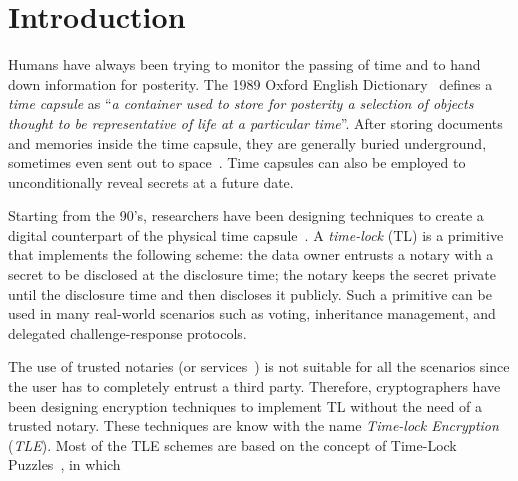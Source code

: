\section{Introduction}\label{sect:introduction}

Humans have always been trying to monitor the passing of time and to hand down information for posterity.
The 1989 Oxford English Dictionary~\cite{dictionary1989oxford} defines a {\em time capsule} as ``{\em a container used to store for posterity a selection of objects thought to be representative of life at a particular time}''.
After storing documents and memories inside the time capsule, they are generally buried underground, sometimes even sent out to space~\cite{jarvis2015time}.
Time capsules can also be employed to unconditionally reveal secrets at a future date.


Starting from the 90's, researchers have been designing techniques to create a digital counterpart of the physical time capsule~\cite{may1993timed}.
%
%
A \textit{time-lock} (TL) is a primitive that implements the following scheme:
%
the data owner entrusts a notary with a secret to be disclosed at the disclosure time; the notary keeps the secret private until the disclosure time and then discloses it publicly.
%
Such a primitive can be used in many real-world scenarios such as voting, inheritance management, and delegated challenge-response protocols.


The use of trusted notaries (or services~\cite{rabin2006time}) is not suitable for all the scenarios since the user has to completely entrust a third party. Therefore, cryptographers have been designing encryption techniques to implement TL without the need of a trusted notary.
%
These techniques are know with the name {\em Time-lock Encryption} ({\em TLE}).
%
%
%
Most of the TLE schemes are based on the concept of Time-Lock Puzzles~\cite{mahmoody-tl,Bitansky:2016:TPR:2840728.2840745}, in which 

